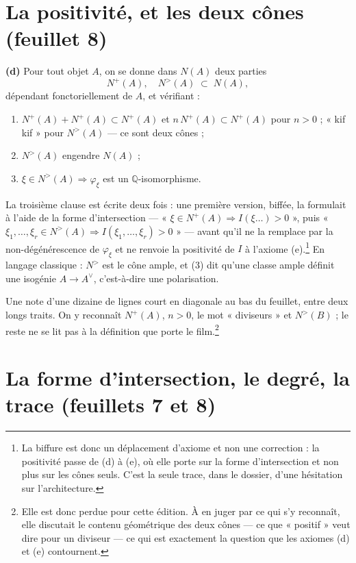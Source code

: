 \documentclass[11pt,a4paper]{article}
\begin{document}
\section*{La positivité, et les deux cônes (feuillet 8)}

\textbf{(d)} Pour tout objet $A$, on se donne dans $N(A)$ deux parties
\[
  N^{+}(A), \quad N^{>}(A) \;\subset\; N(A),
\]
dépendant fonctoriellement de $A$, et vérifiant :

\begin{enumerate}
\item $N^{+}(A) + N^{+}(A) \subset N^{+}(A)$ et $n\,N^{+}(A) \subset N^{+}(A)$
  pour $n > 0$ ; « kif kif » pour $N^{>}(A)$ — ce sont deux cônes ;
\item $N^{>}(A)$ engendre $N(A)$ ;
\item $\xi \in N^{>}(A) \Longrightarrow \varphi_{\xi}$ est un
  $\mathbb{Q}$-isomorphisme.
\end{enumerate}

La troisième clause est écrite deux fois : une première version, biffée, la
formulait à l'aide de la forme d'intersection — « $\xi \in N^{+}(A) \Rightarrow
I(\xi \ldots) > 0$ », puis « $\xi_{1}, \ldots, \xi_{r} \in N^{>}(A) \Rightarrow
I(\xi_{1}, \ldots, \xi_{r}) > 0$ » — avant qu'il ne la remplace par la
non-dégénérescence de $\varphi_{\xi}$ et ne renvoie la positivité de $I$ à
l'axiome (e).\footnote{La biffure est donc un déplacement d'axiome et non une
correction : la positivité passe de (d) à (e), où elle porte sur la forme
d'intersection et non plus sur les cônes seuls. C'est la seule trace, dans le
dossier, d'une hésitation sur l'architecture.} En langage classique : $N^{>}$
est le cône ample, et (3) dit qu'une classe ample définit une isogénie
$A \to A^{\vee}$, c'est-à-dire une polarisation.

Une note d'une dizaine de lignes court en diagonale au bas du feuillet, entre
deux longs traits. On y reconnaît $N^{+}(A)$, $n > 0$, le mot « diviseurs » et
$N^{>}(B)$ ; le reste ne se lit pas à la définition que porte le
film.\footnote{Elle est donc perdue pour cette édition. À en juger par ce qui
s'y reconnaît, elle discutait le contenu géométrique des deux cônes — ce que
« positif » veut dire pour un diviseur — ce qui est exactement la question que
les axiomes (d) et (e) contournent.}

\section*{La forme d'intersection, le degré, la trace (feuillets 7 et 8)}
\end{document}
